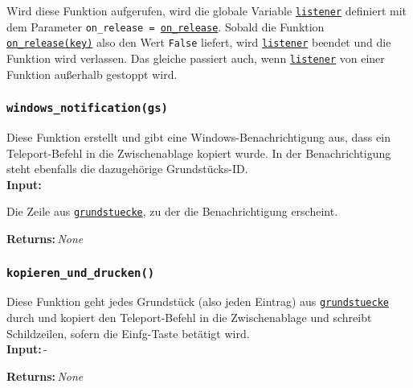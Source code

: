 \documentclass{article}
\newcommand{\initem}[2]{\item[\hspace{0.5em} {\normalfont\ttfamily{#1}} {\normalfont\itshape{(#2)}}]}
\newcommand{\bfpara}[1]{\noindent \textbf{#1:}\,}
\begin{document}
Wird diese Funktion aufgerufen, wird die globale Variable \hyperref[subsec:globale_variablen]{\texttt{listener}} definiert mit dem Parameter \texttt{on\_release = }\hyperref[subsubsec:on_release]{\texttt{on\_release}}. Sobald die Funktion \hyperref[subsubsec:on_release]{\texttt{on\_release(key)}} also den Wert \texttt{False} liefert, wird \hyperref[subsec:globale_variablen]{\texttt{listener}} beendet und die Funktion wird verlassen. Das gleiche passiert auch, wenn \hyperref[subsec:globale_variablen]{\texttt{listener}} von einer Funktion au{\ss}erhalb gestoppt wird.\\[11pt]

\subsubsection*{\texttt{windows\_notification(gs)}}\label{subsubsec:windows_notification}
Diese Funktion erstellt und gibt eine Windows-Benachrichtigung aus, dass ein Teleport-Befehl in die Zwischenablage kopiert wurde. In der Benachrichtigung steht ebenfalls die dazugeh\"orige Grundst\"ucks-ID.\\

\bfpara{Input}
\begin{compactdesc}
	\initem{gs}{str} Die Zeile aus \hyperref[subsec:globale_variablen]{\texttt{grundstuecke}}, zu der die Benachrichtigung erscheint.
\end{compactdesc}
\bfpara{Returns}\textit{None}\\[11pt]

\subsubsection*{\texttt{kopieren\_und\_drucken()}}\label{subsubsec:kopieren_und_drucken}
Diese Funktion geht jedes Grundst\"uck (also jeden Eintrag) aus \hyperref[subsec:globale_variablen]{\texttt{grundstuecke}} durch und kopiert den Teleport-Befehl in die Zwischenablage und schreibt Schildzeilen, sofern die Einfg-Taste bet\"atigt wird.\\

\bfpara{Input}-

\bfpara{Returns}\textit{None}\\
\end{document}
